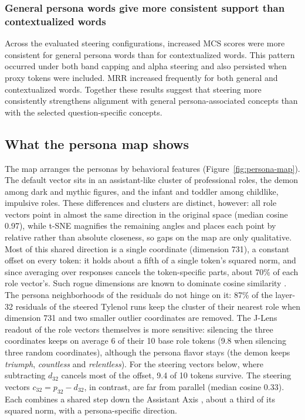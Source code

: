 \subsubsection{General persona words give more consistent support than contextualized words}
Across the evaluated steering configurations, increased MCS scores were more consistent for general persona words than for contextualized words. This pattern occurred under both band capping and alpha steering and also persisted when proxy tokens were included. MRR increased frequently for both general and contextualized words. Together these results suggest that steering more consistently strengthens alignment with general persona-associated concepts than with the selected question-specific concepts.

\subsection{What the persona map shows}
\label{sec:results-map}
The map arranges the personas by behavioral features (Figure~\ref{fig:persona-map}).
The default vector sits in an assistant-like cluster of professional roles,
the demon among dark and mythic figures, and the infant and toddler among childlike, impulsive roles.
These differences and clusters are distinct, however: all role vectors point in almost the same direction in the original space (median cosine 0.97), while t-SNE magnifies the remaining angles and places each point by relative rather than absolute closeness,
so gaps on the map are only qualitative.
Most of this shared direction is a single coordinate (dimension 731), a constant offset on every token:
it holds about a fifth of a single token's squared norm,
and since averaging over responses cancels the token-specific parts, about 70\% of each role vector's.
Such rogue dimensions are known to dominate cosine similarity \citep{timkeyAllBarkNo2021}.
The persona neighborhoods of the residuals do not hinge on it:
87\% of the layer-32 residuals of the steered Tylenol runs keep the cluster of their nearest role
when dimension 731 and two smaller outlier coordinates are removed.
The J-Lens readout of the role vectors themselves is more sensitive:
silencing the three coordinates keeps on average 6 of their 10 base role tokens (9.8 when silencing three random coordinates),
although the persona flavor stays (the demon keeps \textit{triumph}, \textit{countless} and \textit{relentless}).
For the steering vectors below, where subtracting $d_{32}$ cancels most of the offset, 9.4 of 10 tokens survive.
The steering vectors $c_{32} = p_{32} - d_{32}$, in contrast, are far from parallel (median cosine 0.33).
Each combines a shared step down the Assistant Axis \citep{lu2026assistant}, about a third of its squared norm, with a persona-specific direction.

